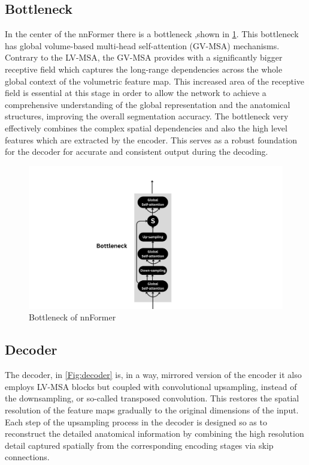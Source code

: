 \subsection{Bottleneck}
In the center of the nnFormer there is a bottleneck ,shown in \cref{Fig:bottleneck}. This bottleneck has global volume-based multi-head self-attention (GV-MSA) mechanisms. Contrary to the LV-MSA, the GV-MSA provides with a significantly bigger receptive field which captures the long-range dependencies across the whole global context of the volumetric feature map. This increased area of the receptive field is essential at this stage in order to allow the network to achieve a comprehensive understanding of the global representation and the anatomical structures, improving the overall segmentation accuracy. The bottleneck very effectively combines the complex spatial dependencies and also the high level features which are extracted by the encoder. This serves as a robust foundation for the decoder for accurate and consistent output during the decoding.

\begin{figure}[htb!] %
\centering
\centering
\includegraphics[width=1\textwidth]{images/Bottleneck.png}
\caption{\centering Bottleneck of nnFormer}
\label{Fig:bottleneck}
\end{figure}

\subsection{Decoder}
The decoder, in \cref{Fig:decoder} is, in a way, mirrored version of the encoder it also employs LV-MSA blocks but coupled with convolutional upsampling, instead of the downsampling, or so-called transposed convolution. This restores the spatial resolution of the feature maps gradually to the original dimensions of the input. Each step of the upsampling process in the decoder is designed so as to reconstruct the detailed anatomical information by combining the high resolution detail captured spatially from the corresponding encoding stages via skip connections. 

